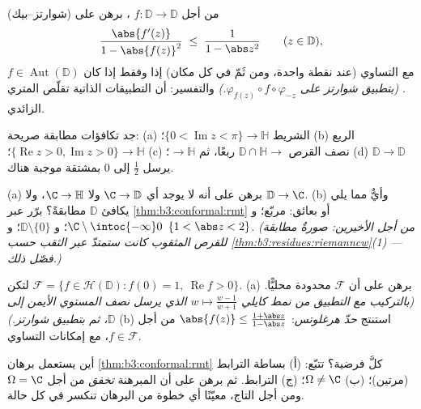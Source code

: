 \begin{exercise}[$\star\star$]\label{exo:b3:conformal:3}
(شوارتز--بيك) من أجل $f\colon \mathbb D \to
\mathbb D$ ، برهن على
\[
\frac{\abs{f'(z)}}{1 - \abs{f(z)}^2} \;\leq\;
\frac{1}{1 - \abs z^2}
\qquad (z \in \mathbb D),
\]
مع التساوي (عند نقطة واحدة، ومن ثَمّ في كل مكان) إذا وفقط إذا
كان $f \in
\operatorname{Aut}(\mathbb D)$. \emph{(بتطبيق شوارتز على $\varphi_{f(z)}\circ
f\circ\varphi_{-z}$.)} والتفسير: أن
التطبيقات الذاتية  تقلّص المتري الزائدي.
\end{exercise}

\begin{exercise}[$\star\star$]\label{exo:b3:conformal:4}
جد تكافؤات مطابقة صريحة:
(a) الشريط $\{0 < \operatorname{Im}z < \pi\} \to \mathbb H$؛
(b) الربع $\{\operatorname{Re}z > 0,
\operatorname{Im}z > 0\} \to \mathbb H$؛
(c) نصف القرص $\mathbb D\cap\mathbb H \to$ ربعًا، ثم $\to \mathbb H$؛
(d) $\mathbb D \to \mathbb D$ يرسل $\frac12$ إلى $0$ بمشتقة موجبة هناك.
\end{exercise}

\begin{exercise}[$\star\star$]\label{exo:b3:conformal:5}
(a) برهن على أنه لا يوجد أي  $\C \to \mathbb D$ ولا $\C \to
\mathbb H$،
ولا $\mathbb D \to \C$.
(b) وأيٌّ مما يلي يكافئ $\mathbb D$ مطابقةً؟ برّر عبر
\cref{thm:b3:conformal:rmt} أو بعائق: مربّع؛ و $\C\setminus\intoc{-\infty}0$؛ و $\mathbb D\setminus\{0\}$؛ و $\{1 < \abs z < 2\}$.
\emph{(من أجل الأخيرين: صورةٌ مطابقة للقرص المثقوب كانت ستمتدّ
عبر الثقب حسب \cref{thm:b3:residues:riemanncw}(1) --- فصّل ذلك.)}
\end{exercise}

\begin{exercise}[$\star\star$]\label{exo:b3:conformal:6}
لتكن $\mathcal F = \{f \in \mathcal H(\mathbb D) : f(0) = 1,\
\operatorname{Re}f > 0\}$.
(a) برهن على أن $\mathcal F$ محدودة محليًّا. \emph{(بالتركيب مع
التطبيق من نمط كايلي $w \mapsto \frac{w -
1}{w + 1}$ الذي يرسل نصف المستوي الأيمن إلى
$\mathbb D$، ثم بتطبيق شوارتز.)}
(b) استنتج \emph{حدّ هرغلوتس}: $\abs{f(z)} \leq
\frac{1 + \abs z}{1 - \abs z}$ من أجل $f \in \mathcal F$، مع
إمكانات التساوي.
\end{exercise}

\begin{exercise}[$\star\star\star$]\label{exo:b3:conformal:7}
أين يستعمل برهان \cref{thm:b3:conformal:rmt} كلَّ فرضية؟ تتبّع: (أ) بساطة
الترابط (مرتين)؛ (ب) $\Omega \neq \C$؛ (ج) الترابط. ثم برهن
على أن المبرهنة \emph{تخفق} من أجل $\Omega = \C$ ومن أجل
التاج، معيّنًا أي خطوة من البرهان تنكسر في كل حالة.
\end{exercise}

